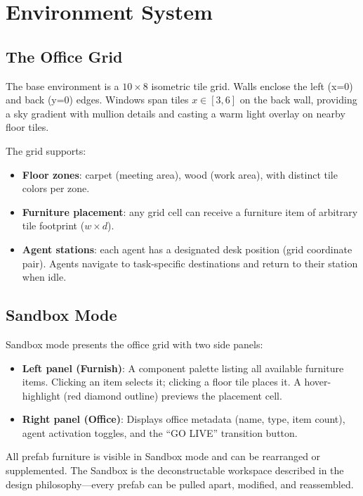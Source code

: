\documentclass[11pt,letterpaper]{article}
\begin{document}
\section{Environment System}

\subsection{The Office Grid}

The base environment is a $10 \times 8$ isometric tile grid. Walls enclose the left (x=0) and back (y=0) edges. Windows span tiles $x \in [3,6]$ on the back wall, providing a sky gradient with mullion details and casting a warm light overlay on nearby floor tiles.

The grid supports:
\begin{itemize}[leftmargin=2em]
  \item \textbf{Floor zones}: carpet (meeting area), wood (work area), with distinct tile colors per zone.
  \item \textbf{Furniture placement}: any grid cell can receive a furniture item of arbitrary tile footprint ($w \times d$).
  \item \textbf{Agent stations}: each agent has a designated desk position (grid coordinate pair). Agents navigate to task-specific destinations and return to their station when idle.
\end{itemize}

\subsection{Sandbox Mode}

Sandbox mode presents the office grid with two side panels:

\begin{itemize}[leftmargin=2em]
  \item \textbf{Left panel (Furnish)}: A component palette listing all available furniture items. Clicking an item selects it; clicking a floor tile places it. A hover-highlight (red diamond outline) previews the placement cell.
  \item \textbf{Right panel (Office)}: Displays office metadata (name, type, item count), agent activation toggles, and the ``GO LIVE'' transition button.
\end{itemize}

All prefab furniture is visible in Sandbox mode and can be rearranged or supplemented. The Sandbox is the deconstructable workspace described in the design philosophy---every prefab can be pulled apart, modified, and reassembled.
\end{document}
